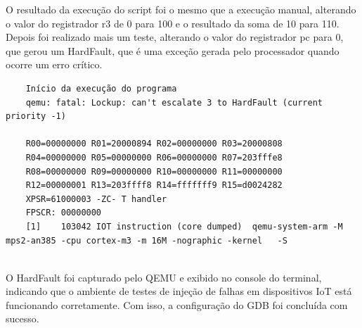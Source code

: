 \documentclass[12pt,a4paper]{article}
\begin{document}
O resultado da execução do script foi o mesmo que a execução manual, alterando o valor do registrador r3 de 0 para 100 e o resultado da soma de 10 para 110. Depois foi realizado mais um teste, alterando o valor do registrador pc para 0, que gerou um HardFault, que é uma exceção gerada pelo processador quando ocorre um erro crítico. 
\begin{lstlisting} 
    Início da execução do programa
    qemu: fatal: Lockup: can't escalate 3 to HardFault (current priority -1)

    R00=00000000 R01=20000894 R02=00000000 R03=20000808
    R04=00000000 R05=00000000 R06=00000000 R07=203fffe8
    R08=00000000 R09=00000000 R10=00000000 R11=00000000
    R12=00000001 R13=203ffff8 R14=fffffff9 R15=d0024282
    XPSR=61000003 -ZC- T handler
    FPSCR: 00000000
    [1]    103042 IOT instruction (core dumped)  qemu-system-arm -M mps2-an385 -cpu cortex-m3 -m 16M -nographic -kernel   -S  
    
\end{lstlisting}
O HardFault foi capturado pelo QEMU e exibido no console do terminal, indicando que o ambiente de testes de injeção de falhas em dispositivos IoT está funcionando corretamente. Com isso, a configuração do GDB foi concluída com sucesso.


\printbibliography[title={Referências Bibliográficas}]
\end{document}
